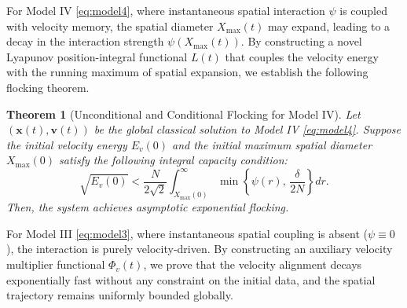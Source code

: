 \documentclass[11pt]{amsart}
\newtheorem{theorem}{Theorem}[section]
\numberwithin{equation}{section}
\begin{document}
For Model IV \eqref{eq:model4}, where instantaneous spatial interaction $\psi$ is coupled with velocity memory, the spatial diameter $X_{\max}(t)$ may expand, leading to a decay in the interaction strength $\psi(X_{\max}(t))$. By constructing a novel Lyapunov position-integral functional $L(t)$ that couples the velocity energy with the running maximum of spatial expansion, we establish the following flocking theorem.
\begin{theorem}[Unconditional and Conditional Flocking for Model IV]\label{thm:model4}
Let $(\boldsymbol{x}(t),\boldsymbol{v}(t))$ be the global classical solution to Model IV \eqref{eq:model4}. Suppose the initial velocity energy $E_v(0)$ and the initial maximum spatial diameter $X_{\max}(0)$ satisfy the following integral capacity condition:
\begin{equation}\label{eq:flocking_capacity_cond}
\sqrt{E_v(0)} < \frac{N}{2\sqrt{2}} \int_{X_{\max}(0)}^{\infty} \min \left\{ \psi(r),\, \frac{\delta}{2N} \right\} dr.
\end{equation}
Then, the system achieves asymptotic exponential flocking.
\end{theorem}

For Model III \eqref{eq:model3}, where instantaneous spatial coupling is absent ($\psi \equiv 0$), the interaction is purely velocity-driven. By constructing an auxiliary velocity multiplier functional $\Phi_v(t)$, we prove that the velocity alignment decays exponentially fast without any constraint on the initial data, and the spatial trajectory remains uniformly bounded globally.
\end{document}
